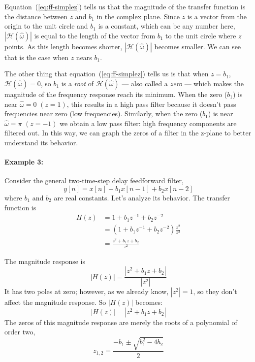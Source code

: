 Equation~(\ref{eq:ff-simplez}) tells us that the magnitude of the
transfer function is the distance between $z$ and $b_1$ in the complex
plane.  Since $z$ is a vector from the origin to the unit circle and
$b_1$ is a constant, which can be any number here,
$|\mathcal{H}(\hat{\omega})|$ is equal to the length of the vector
from $b_1$ to the unit circle where $z$ points. As this length becomes
shorter, $|\mathcal{H}(\hat{\omega})|$ becomes smaller. We can see
that is the case when $z$ nears $b_1$.

The other thing that equation~(\ref{eq:ff-simplez}) tells us is that
when $z=b_1$, $\mathcal{H}(\hat{\omega})=0$, so $b_1$ is a \emph{root}
of $\mathcal{H}(\hat{\omega})$ --- also called a \emph{zero} --- which
makes the magnitude of the frequency response reach its
minimum.
When the zero ($b_1$) is near $\hat{\omega}=0$ $(z=1)$,
this results in a high pass filter because it doesn't pass frequencies
near zero (low frequencies). Similarly, when the zero ($b_1$) is near
$\hat{\omega}=\pi$ $(z=-1)$ we obtain a low pass filter: high frequency
components are filtered out. In this way, we can graph the zeros of a filter in the z-plane to better understand its behavior. 

\paragraph*{Example 3:}

Consider the general two-time-step delay feedforward filter,
\begin{equation*}
y[n] = x[n] + b_1 x[n-1] + b_2 x[n-2]
\end{equation*}
where $b_1$ and $b_2$ are real constants. Let's analyze its
behavior. The transfer function is
\begin{align*}
H(z) &= 1 + b_1 z^{-1} + b_2 z^{-2} \\
     &= (1 + b_1 z^{-1} + b_2 z^{-2}) \frac{z^2}{z^2} \\
     &= \frac{z^2 + b_1 z + b_2}{z^2}
\end{align*}

The magnitude response is
\begin{equation}
|H(z)| = \frac{|z^2 + b_1 z + b_2|}{|z^2|} \label{eq:twostep-ex}
\end{equation}
It has two poles at zero; however, as we already know, $|z^2|=1$, so
they don't affect the magnitude response. So $|H(z)|$ becomes:
\begin{equation}
|H(z)|=|z^2 + b_1 z + b_2| \label{eq:twostep-ex-magresp}
\end{equation}
The zeros of this magnitude response are merely the roots of a
polynomial of order two,
\begin{equation}
z_{1,2} = \frac{-b_1 \pm \sqrt{b_1^2 - 4 b_2}}{2}
\label{eq:ff-z0s}
\end{equation}

